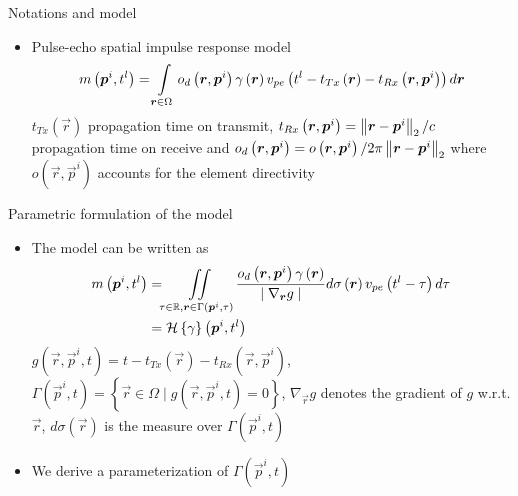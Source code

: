 {\begin{block}{Notations and model}
	\begin{itemize}
		\item Pulse-echo spatial impulse response model
		\begin{align}
			m\left(\bm{p}^i, t^l\right)  = \int \limits_{\bm{r} \in \Omega} o_d \left(\bm{r}, \bm{p}^i\right) \gamma \left(\bm{r}\right) \nonumber v_{pe} \left(t^l - t_{Tx} \left(\bm{r}\right) - t_{Rx} \left( \bm{r}, \bm{p}^i \right) \right)  d\bm{r}
		\end{align} 
		$t_{Tx} \left(\vec{r}\right)$ propagation time on transmit, $t_{Rx} \left( \bm{r}, \bm{p}^i  \right) = \left\lVert\bm{r} - \bm{p}^i\right\rVert_{2} / c$ propagation time on receive and $o_d \left(\bm{r}, \bm{p}^i\right) = o \left(\bm{r}, \bm{p}^i\right) / 2 \pi \left\lVert\bm{r} - \bm{p}^i\right\rVert_{2}$ where $o \left(\vec{r}, \vec{p}^i\right)$ accounts for the element directivity
	\end{itemize}
\end{block}
\vfill 
\begin{block}{Parametric formulation of the model}
\begin{itemize}
	\item The model can be written as
	\begin{align}
	\label{eq_inv_problem_cont_domain}
		m\left(\bm{p}^i, t^l\right) &= \iint \limits_{ \tau \in \mathbb{R}, \bm{r} \in \Gamma\left(\bm{p}^i, \tau\right)} \frac{o_d\left(\bm{r}, \bm{p}^i\right)\gamma \left(\bm{r}\right)}{\mid \nabla_{\bm{r}} g \mid} d \sigma \left(\bm{r}\right) v_{pe} \left(t^l - \tau\right) d \tau \nonumber \\
		&= \mathcal{H}\left\lbrace \gamma\right\rbrace \left(\bm{p}^i, t^l\right) 
	\end{align}
	$g\left(\vec{r}, \vec{p}^i, t\right) = t - t_{Tx} \left(\vec{r}\right) - t_{Rx} \left(\vec{r}, \vec{p}^i\right)$, $\Gamma \left(\vec{p}^i, t \right) = \left\lbrace \vec{r} \in \Omega \; | \; g\left(\vec{r}, \vec{p}^i, t \right) = 0 \right\rbrace$, $\nabla_{\vec{r}} g$ denotes the gradient of $g$ w.r.t. $\vec{r}$, $d\sigma \left(\vec{r}\right)$ is the measure over $\Gamma \left(\vec{p}^i, t \right)$
	\item We derive a parameterization of $\Gamma \left(\vec{p}^i, t \right)$
	\begin{equation}
	\label{eq_param_equation_generic}

\end{equation}
\end{itemize}
\end{block}}
